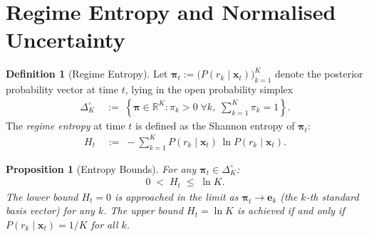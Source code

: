 \documentclass[12pt,openany]{book}
\newcommand{\R}{\mathbb{R}}
\newcommand{\bfpi}{\boldsymbol{\pi}}
\newcommand{\bfx}{\mathbf{x}}
\numberwithin{equation}{chapter}
\theoremstyle{plain}
\newtheorem{proposition}[theorem]{Proposition}
\theoremstyle{definition}
\newtheorem{definition}[theorem]{Definition}
\theoremstyle{remark}
\numberwithin{equation}{chapter}
\theoremstyle{plain}
\newcommand{\bfe}{\mathbf{e}}
\begin{document}
\section{Regime Entropy and Normalised Uncertainty}

\begin{definition}[Regime Entropy]
\label{def:regime-entropy}
Let $\bfpi_t := \bigl(P(r_k \mid \bfx_t)\bigr)_{k=1}^{K}$
denote the posterior probability vector at time $t$,
lying in the open probability simplex
\begin{align}
  \Delta_K^{\circ}
  &\;:=\;
  \left\{
    \bfpi \in \R^K :
    \pi_k > 0\;\forall k,\;
    \textstyle\sum_{k=1}^{K} \pi_k = 1
  \right\}.
  \label{eq:open-simplex}
\end{align}
The \emph{regime entropy} at time $t$ is defined as the
Shannon entropy of $\bfpi_t$:
\begin{align}
  H_t
  &\;:=\;
  -\sum_{k=1}^{K} P(r_k \mid \bfx_t)\,
      \ln P(r_k \mid \bfx_t).
  \label{eq:entropy}
\end{align}
\end{definition}

\begin{proposition}[Entropy Bounds]
\label{prop:entropy-bounds}
For any $\bfpi_t \in \Delta_K^{\circ}$:
\begin{align}
  0 \;<\; H_t \;\leq\; \ln K.
  \label{eq:entropy-bounds}
\end{align}
The lower bound $H_t = 0$ is approached in the limit as
$\bfpi_t \to \bfe_k$ (the $k$-th standard basis vector) for
any $k$.  The upper bound $H_t = \ln K$ is achieved if and
only if $P(r_k \mid \bfx_t) = 1/K$ for all $k$.
\end{proposition}
\end{document}
